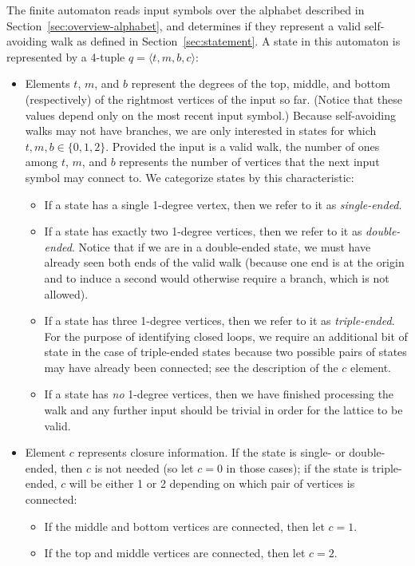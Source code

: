 The finite automaton reads input symbols over the alphabet described in Section~\ref{sec:overview-alphabet}, and determines if they represent a valid self-avoiding walk as defined in Section~\ref{sec:statement}. A state in this automaton is represented by a 4-tuple $q = \langle t, m, b, c\rangle$:
\begin{itemize}
\item Elements $t$, $m$, and $b$ represent the degrees of the top, middle, and bottom (respectively) of the rightmost vertices of the input so far. (Notice that these values depend only on the most recent input symbol.) Because self-avoiding walks may not have branches, we are only interested in states for which $t, m, b \in \{0, 1, 2\}$. Provided the input is a valid walk, the number of ones among $t$, $m$, and $b$ represents the number of vertices that the next input symbol may connect to. We categorize states by this characteristic:
\begin{itemize}
\item If a state has a single 1-degree vertex, then we refer to it as \emph{single-ended}.
\item If a state has exactly two 1-degree vertices, then we refer to it as \emph{double-ended}. Notice that if we are in a double-ended state, we must have already seen both ends of the valid walk (because one end is at the origin and to induce a second would otherwise require a branch, which is not allowed).
\item If a state has three 1-degree vertices, then we refer to it as \emph{triple-ended}. For the purpose of identifying closed loops, we require an additional bit of state in the case of triple-ended states because two possible pairs of states may have already been connected; see the description of the $c$ element.
\item If a state has \emph{no} 1-degree vertices, then we have finished processing the walk and any further input should be trivial in order for the lattice to be valid.
\end{itemize}
\item Element $c$ represents closure information. If the state is single- or double-ended, then $c$ is not needed (so let $c=0$ in those cases); if the state is triple-ended, $c$ will be either 1 or 2 depending on which pair of vertices is connected:
\begin{itemize}
\item If the middle and bottom vertices are connected, then let $c=1$.
\item If the top and middle vertices are connected, then let $c=2$.
\end{itemize}
\end{itemize}


